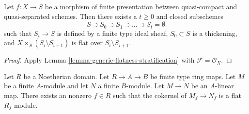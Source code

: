 \begin{lemma}
\label{lemma-generic-flatness-stratification-scheme}
Let $f : X \to S$ be a morphism of finite presentation between quasi-compact
and quasi-separated schemes. Then there exists a $t \geq 0$ and closed
subschemes
$$
S \supset S_0 \supset S_1 \supset \ldots \supset S_t = \emptyset
$$
such that $S_i \to S$ is defined by a finite type ideal sheaf,
$S_0 \subset S$ is a thickening, and
$X \times_S (S_i \setminus S_{i + 1})$ is flat over $S_i \setminus S_{i + 1}$.
\end{lemma}

\begin{proof}
Apply Lemma \ref{lemma-generic-flatness-stratification}
with $\mathcal{F} = \mathcal{O}_X$.
\end{proof}

\begin{lemma}
\label{lemma-cokernel-flat}
Let $R$ be a Noetherian domain. Let $R \to A \to B$ be finite type ring maps.
Let $M$ be a finite $A$-module and let $N$ a finite $B$-module.
Let $M \to N$ be an $A$-linear map. There exists an nonzero $f \in R$
such that the cokernel of $M_f \to N_f$ is a flat $R_f$-module.
\end{lemma}

